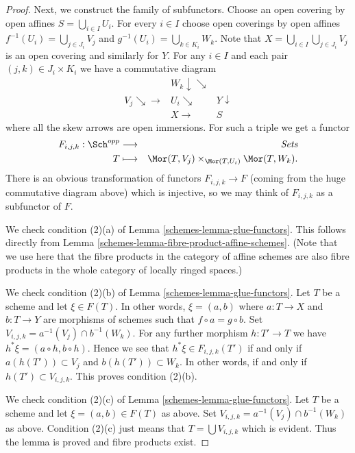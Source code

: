 \begin{proof}
\medskip\noindent
Next, we construct the family of subfunctors.
Choose an open covering by open affines
$S = \bigcup\nolimits_{i \in I} U_i$.
For every $i \in I$ choose open coverings by open affines
$f^{-1}(U_i) = \bigcup\nolimits_{j \in J_i} V_j$ and
$g^{-1}(U_i) = \bigcup\nolimits_{k \in K_i} W_k$.
Note that $X = \bigcup_{i \in I} \bigcup_{j \in J_i} V_j$
is an open covering and similarly for $Y$.
For any $i \in I$ and each pair $(j, k) \in J_i \times K_i$
we have a commutative diagram
$$
\begin{array}{ccc} & W_k \downarrow\searrow &  \\ V_j \searrow\longrightarrow & U_i \searrow & Y \downarrow \\  & X \longrightarrow & S\end{array}
$$
where all the skew arrows are open immersions. For such a
triple we get a functor
\begin{eqnarray*}
F_{i, j, k} : \Sch^{opp} & \longrightarrow & \textit{Sets} \\
T & \longmapsto &
\Mor(T, V_j) \times_{\Mor(T, U_i)} \Mor(T, W_k).
\end{eqnarray*}
There is an obvious transformation of functors $F_{i, j, k} \to F$
(coming from the huge commutative diagram above)
which is injective, so we may think of $F_{i, j, k}$ as a subfunctor
of $F$.

\medskip\noindent
We check condition (2)(a) of Lemma \ref{schemes-lemma-glue-functors}.
This follows directly from Lemma \ref{schemes-lemma-fibre-product-affine-schemes}.
(Note that we use here that the fibre products in the category of
affine schemes are also fibre products in the whole category of locally
ringed spaces.)

\medskip\noindent
We check condition (2)(b) of Lemma \ref{schemes-lemma-glue-functors}.
Let $T$ be a scheme and let $\xi \in F(T)$. In other words,
$\xi = (a, b)$ where $a : T \to X$ and $b : T \to Y$ are
morphisms of schemes such that $f \circ a = g \circ b$.
Set $V_{i, j, k} = a^{-1}(V_j) \cap b^{-1}(W_k)$. For any
further morphism $h : T' \to T$ we have
$h^*\xi = (a \circ h, b \circ h)$. Hence we see that
$h^*\xi \in F_{i, j, k}(T')$ if and only if
$a(h(T')) \subset V_j$ and $b(h(T')) \subset W_k$.
In other words, if and only if $h(T') \subset V_{i, j, k}$.
This proves condition (2)(b).

\medskip\noindent
We check condition (2)(c) of Lemma \ref{schemes-lemma-glue-functors}.
Let $T$ be a scheme and let $\xi = (a, b) \in F(T)$ as above.
Set $V_{i, j, k} = a^{-1}(V_j) \cap b^{-1}(W_k)$ as above.
Condition (2)(c) just means that $T = \bigcup V_{i, j, k}$
which is evident. Thus the lemma is proved and fibre products
exist.
\end{proof}

